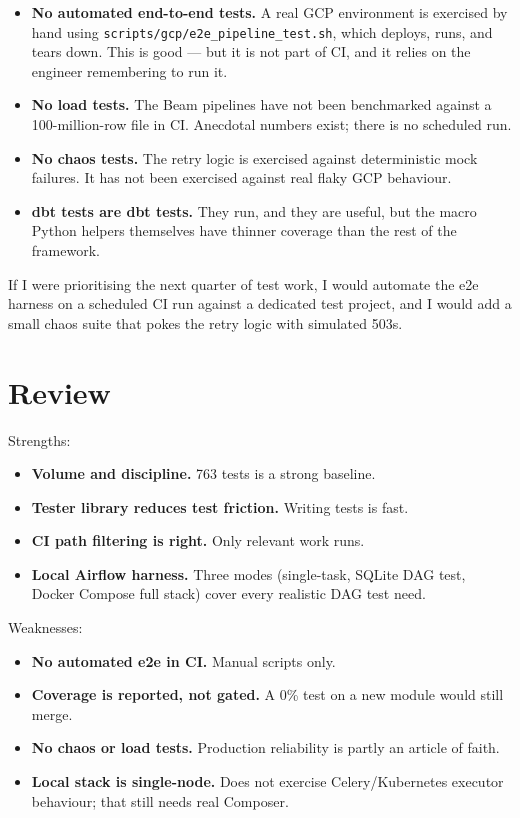 \documentclass[
  11pt,
  british,
  oneside]{book}
\providecommand{\tightlist}{%
  \setlength{\itemsep}{0pt}\setlength{\parskip}{0pt}}
\begin{document}
\begin{itemize}
\tightlist
\item
  \textbf{No automated end-to-end tests.} A real GCP environment is
  exercised by hand using \texttt{scripts/gcp/e2e\_pipeline\_test.sh},
  which deploys, runs, and tears down. This is good --- but it is not
  part of CI, and it relies on the engineer remembering to run it.
\item
  \textbf{No load tests.} The Beam pipelines have not been benchmarked
  against a 100-million-row file in CI. Anecdotal numbers exist; there
  is no scheduled run.
\item
  \textbf{No chaos tests.} The retry logic is exercised against
  deterministic mock failures. It has not been exercised against real
  flaky GCP behaviour.
\item
  \textbf{dbt tests are dbt tests.} They run, and they are useful, but
  the macro Python helpers themselves have thinner coverage than the
  rest of the framework.
\end{itemize}

If I were prioritising the next quarter of test work, I would automate
the e2e harness on a scheduled CI run against a dedicated test project,
and I would add a small chaos suite that pokes the retry logic with
simulated 503s.

\hypertarget{review}{%
\section{Review}\label{review}}

Strengths:

\begin{itemize}
\tightlist
\item
  \textbf{Volume and discipline.} 763 tests is a strong baseline.
\item
  \textbf{Tester library reduces test friction.} Writing tests is fast.
\item
  \textbf{CI path filtering is right.} Only relevant work runs.
\item
  \textbf{Local Airflow harness.} Three modes (single-task, SQLite DAG
  test, Docker Compose full stack) cover every realistic DAG test need.
\end{itemize}

Weaknesses:

\begin{itemize}
\tightlist
\item
  \textbf{No automated e2e in CI.} Manual scripts only.
\item
  \textbf{Coverage is reported, not gated.} A 0\% test on a new module
  would still merge.
\item
  \textbf{No chaos or load tests.} Production reliability is partly an
  article of faith.
\item
  \textbf{Local stack is single-node.} Does not exercise
  Celery/Kubernetes executor behaviour; that still needs real Composer.
\end{itemize}
\end{document}
